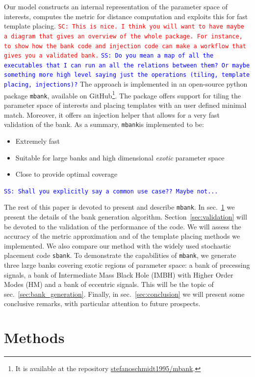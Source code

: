 \documentclass[twocolumn,showpacs,preprintnumbers,nofootinbib,prd,
superscriptaddress,10pt]{revtex4-2}
\newcommand{\mbank}{\texttt{mbank}}
\newcommand{\stefano}[1]{{\textcolor{blue}{\texttt{SS: #1}} }}
\newcommand{\sarah}[1]{{\textcolor{red}{\texttt{SC: #1}} }}
\begin{document}
Our model constructs an internal representation of the parameter space of interests, computes the metric for distance computation and exploits this for fast template placing. \sarah{This is nice. I think you will want to have maybe a diagram that gives an overview of the whole package. For instance, to show how the bank code and injection code can make a workflow that gives you a validated bank.} \stefano{Do you mean a map of all the executables that I can run an all the relations between them? Or maybe something more high level saying just the operations (tiling, template placing, injections)?}
The approach is implemented in an open-source python package \mbank, available on GitHub\footnote{
It is available at the repository \href{https://github.com/stefanoschmidt1995/mbank}{stefanoschmidt1995/mbank}.}.
The package offers support for tiling the parameter space of interests and placing templates with an user defined minimal match. Moreover, it offers an injection helper that allows for a very fast validation of the bank.
As a summary, \mbank is implemented to be:
\begin{itemize}
	\item Extremely fast
	\item Suitable for large banks and high dimensional {\it exotic} parameter space
	\item Close to provide optimal coverage
\end{itemize}
\stefano{Shall you explicitly say a common use case?? Maybe not...}

The rest of this paper is devoted to present and describe \mbank.
In sec.~\ref{sec:methods} we present the details of the bank generation algorithm.
Section~\ref{sec:validation} will be devoted to the validation of the performance of the code. We will assess the accuracy of the metric approximation and of the template placing methods we implemented. We also compare our method with the widely used stochastic placement code \texttt{sbank}.
To demonstrate the capabilities of \mbank, we generate three large banks covering exotic regions of parameter space: a bank of precessing signals, a bank of Intermediate Mass Black Hole (IMBH) with Higher Order Modes (HM) and a bank of eccentric signals. This will be the topic of sec.~\ref{sec:bank_generation}.
Finally, in sec.~\ref{sec:conclusion} we will present some conclusive remarks, with particular attention to future prospects.

\section{Methods} \label{sec:methods}
\end{document}
